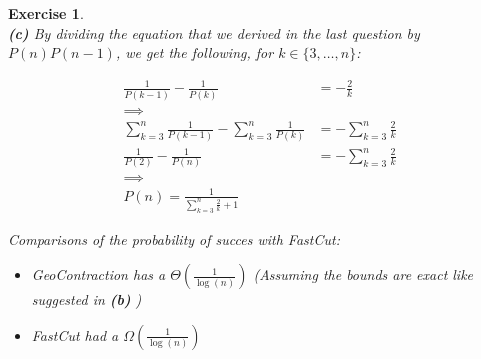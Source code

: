 \documentclass{article}
\newtheorem{exo}{Exercise}
\begin{document}
\begin{exo}{\ \\}
\noindent
\textbf{(c)} By dividing the equation that we derived in the last question by $P(n)P(n-1)$, we get the following, for $k \in \{3, \dots, n\}$:

\begin{align*}
    \frac{1}{P(k-1)} - \frac{1}{P(k)}  &= - \frac{2}{k}  \\
    \implies & \\
    \sum_{k=3}^{n} \frac{1}{P(k-1)} - \sum_{k=3}^{n} \frac{1}{P(k)}  &=
    - \sum_{k=3}^{n} \frac{2}{k}  \\
    \frac{1}{P(2)} - \frac{1}{P(n)}  &= -\sum_{k=3}^{n} \frac{2}{k}  \\
    \implies &\\
    P(n) = \frac{1}{\sum_{k=3}^{n} \frac{2}{k} + 1} 
\end{align*}

Comparisons of the probability of succes with FastCut:

\begin{itemize} 
    \item GeoContraction has a $\Theta(\frac{1}{\log(n)})$ (Assuming the bounds are exact like suggested in \textbf{(b)} )
    \item FastCut had a $\Omega(\frac{1}{\log(n)})$ 
\end{itemize}


\end{exo}
\end{document}
